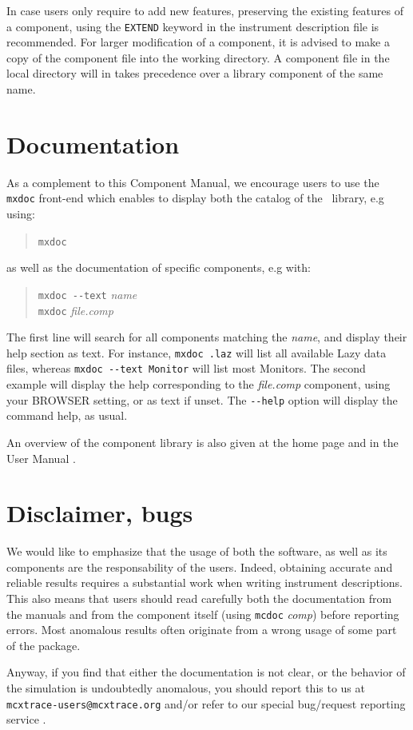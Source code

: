In case users only require to add new features, preserving the existing features of a component, 
using the \verb+EXTEND+ keyword in the instrument description file is recommended. For larger modification of a component, it is advised to make a copy
of the component file into the working directory.
A component file in the local directory will in \MCX takes precedence over
a library component of the same name.

\section{Documentation}
As a complement to this Component Manual, we encourage users to use
the \verb+mxdoc+ front-end which enables to display both the
catalog of the \MCX\ library, e.g using: 
\begin{quote}
  \verb|mxdoc|
\end{quote}
as well as the documentation of specific components, e.g with:
\begin{quote}
  \verb|mxdoc --text| \textit{name} \\
  \verb|mxdoc| \textit{file.comp}
\end{quote}
The first line will search for all components matching the \textit{name},
and display their help section as text. For instance, \verb+mxdoc .laz+ will list all available Lazy data files, whereas \verb+mxdoc --text Monitor+ will list most Monitors.
The second example will display the help corresponding to
the \textit{file.comp} component, using your
BROWSER setting, or as text if unset.
The \verb+--help+ option will display the command help, as usual.

An overview of the component library is also given at the \MCX home page \cite{mcxtrace_webpage} and in the User Manual \cite{mcxtracemanual}.

\section{Disclaimer, bugs}

We would like to emphasize that the usage of both the \MCX software, as well as
its components are the responsability of the users. Indeed, obtaining accurate
and reliable results requires a substantial work when writing instrument
descriptions. This also means that users should read carefully both the
documentation from the manuals \cite{mcxtracemanual} and from the component
itself (using \verb+mcdoc+ \textit{comp}) before reporting errors. Most
anomalous results often originate from a wrong usage of some part of the
package.

Anyway, if you find that either the documentation is not clear, or the behavior
of the simulation is undoubtedly anomalous, you should report this to us at
\hbox{\texttt{mcxtrace-users@mcxtrace.org}} and/or refer to our special bug/request reporting service
\cite{mczilla_webpage}.
